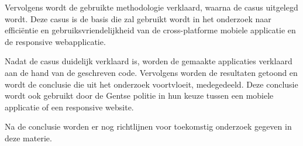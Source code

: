 Vervolgens wordt de gebruikte methodologie verklaard, waarna de casus uitgelegd wordt.
Deze casus is de basis die zal gebruikt wordt in het onderzoek naar efficiëntie en gebruiksvriendelijkheid van de
cross-platforme mobiele applicatie en de responsive webapplicatie.

Nadat de casus duidelijk verklaard is, worden de gemaakte applicaties verklaard aan de hand van de geschreven code.
Vervolgens worden de resultaten getoond en wordt de conclusie die uit het onderzoek voortvloeit, medegedeeld.
Deze conclusie wordt ook gebruikt door de Gentse politie in hun keuze tussen een mobiele applicatie of een responsive website.

Na de conclusie worden er nog richtlijnen voor toekomstig onderzoek gegeven in deze materie.

